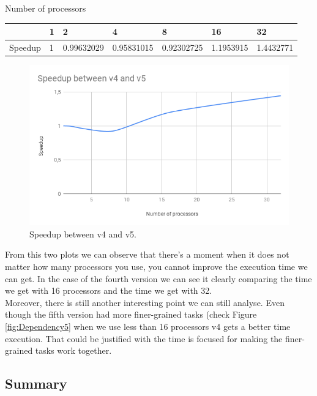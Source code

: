 \documentclass[12]{article}
\begin{document}
\begin{table}[h]
\begin{center}
Number of processors 
\end{center}
\begin{tabular}{l|l|l|l|l|l|l|}
\cline{2-7}
                              & 1 & 2              & 4              & 8              & 16            & 32            \\ \hline
\multicolumn{1}{|l|}{Speedup} & 1 & 0.99632029 & 0.95831015 & 0.92302725 & 1.1953915 & 1.4432771 \\ \hline
\end{tabular}
\end{table}


\begin{figure}[H]
\centering  \includegraphics[width=\linewidth]{images/Speedup.png}
  \caption{Speedup between v4 and v5.}
  \label{fig:PlotComparison}
\end{figure}


From this two plots we can observe that there's a moment when it does not matter how many processors you use, you cannot improve the execution time we can get. In the case of the fourth version we can see it clearly comparing the time we get with 16 processors and the time we get with 32. \\

Moreover, there is still another interesting point we can still analyse. Even though the fifth version had more finer-grained tasks (check Figure \ref{fig:Dependency5} when we use less than 16 processors v4 gets a better time execution. That could be justified with the time is focused for making the finer-grained tasks work together. 


\subsection{Summary}
\end{document}
